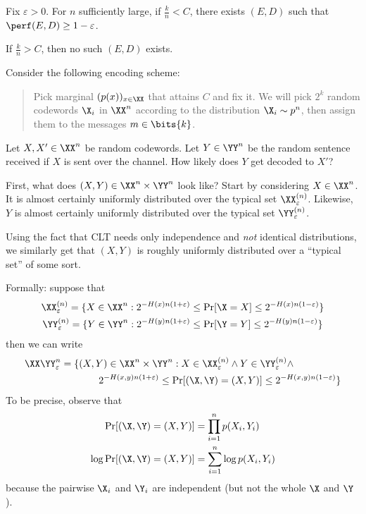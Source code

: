 \documentclass[class=co432,notes,tikz]{agony}
\begin{document}
\begin{theorem}
  Fix $\varepsilon > 0$. For $n$ sufficiently large, if $\frac k n < C$,
  there exists $(E, D)$ such that $\perf(E,D) \geq 1-\varepsilon$.

  If $\frac k n > C$, then no such $(E, D)$ exists.
\end{theorem}
\begin{prf}
  Consider the following encoding scheme:
  \begin{quote}
    Pick marginal $(p(x))_{x\in\XX}$ that attains $C$ and fix it.
    We will pick $2^k$ \iid random codewords $\X_i$ in $\XX^n$
    according to the distribution $\X_i \sim p^n$,
    then assign them to the messages $m \in \bits{k}$.
  \end{quote}
  Let $X,X' \in \XX^n$ be random codewords.
  Let $Y \in \YY^n$ be the random sentence received if $X$ is sent over the channel.
  How likely does $Y$ get decoded to $X'$?

  First, what does $(X,Y) \in \XX^n \times \YY^n$ look like?
  Start by considering $X \in \XX^n$.
  It is almost certainly uniformly distributed over the typical set $\XX_\varepsilon^{(n)}$.
  Likewise, $Y$ is almost certainly uniformly distributed over the typical set $\YY_\varepsilon^{(n)}$.

  Using the fact that CLT needs only independence and \emph{not}
  identical distributions, we similarly get that $(X,Y)$
  is roughly uniformly distributed over a ``typical set'' of some sort.

  Formally: suppose that
  \begin{gather*}
    \XX_\varepsilon^{(n)} = \{ X \in \XX^n : 2^{-H(x)n(1+\varepsilon)} \leq \Pr[\X=X] \leq 2^{-H(x)n(1-\varepsilon)}\} \\
    \YY_\varepsilon^{(n)} = \{ Y \in \YY^n : 2^{-H(y)n(1+\varepsilon)} \leq \Pr[\Y=Y] \leq 2^{-H(y)n(1-\varepsilon)}\}
  \end{gather*}
  then we can write
  \begin{align*}
    \XX\YY_{\varepsilon}^n = \{
     & (X,Y) \in \XX^n\times\YY^n : X \in \XX_\varepsilon^{(n)} \land Y \in \YY_\varepsilon^{(n)} \land \\
     & \qquad 2^{-H(x,y)n(1+\varepsilon)} \leq \Pr[(\X,\Y) = (X,Y)] \leq 2^{-H(x,y)n(1-\varepsilon)}\}
  \end{align*}
  To be precise, observe that
  \begin{align*}
    \Pr[(\X,\Y) = (X,Y)]      & = \prod_{i=1}^n p(X_i, Y_i)     \\
    \log \Pr[(\X,\Y) = (X,Y)] & = \sum_{i=1}^n \log p(X_i, Y_i)
  \end{align*}
  because the pairwise $\X_i$ and $\Y_i$ are independent (but not the whole $\X$ and $\Y$).


\end{prf}
\end{document}
